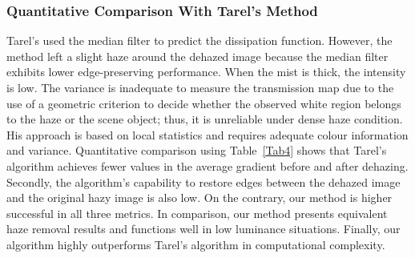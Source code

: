 \documentclass[doctor,english,listoffigures,listoftables]{thesis-uestc}
\begin{document}
\subsubsection{Quantitative Comparison With Tarel's\cite{a36} Method}
Tarel's\cite {a36} used the median filter to predict the dissipation function. However, the method left a slight haze around the dehazed image because the median filter exhibits lower edge-preserving performance. When the mist is thick, the intensity is low. The variance is inadequate to measure the transmission map due to the use of a geometric criterion to decide whether the observed white region belongs to the haze or the scene object; thus, it is unreliable under dense haze condition. His approach is based on local statistics and requires adequate colour information and variance. Quantitative comparison using Table~\ref{Tab4} shows that Tarel's\cite {a36} algorithm achieves fewer values in the average gradient before and after dehazing. Secondly, the algorithm's capability to restore edges between the dehazed image and the original hazy image is also low.   
On the contrary, our method is higher successful in all three metrics.
In comparison, our method presents equivalent haze removal results and functions well in low luminance situations. 
Finally, our algorithm highly outperforms Tarel's\cite {a36} algorithm in computational complexity.
\end{document}
